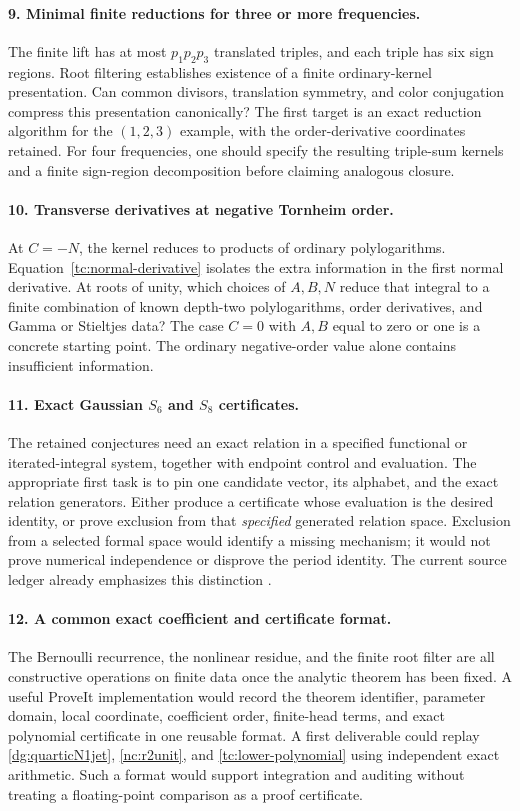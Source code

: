 \documentclass[11pt,a4paper]{article}
\numberwithin{equation}{section}
\theoremstyle{definition}
\theoremstyle{remark}
\begin{document}
\paragraph{9. Minimal finite reductions for three or more frequencies.}
The finite lift has at most $p_1p_2p_3$ translated triples, and each
triple has six sign regions. Root filtering establishes existence
of a finite ordinary-kernel presentation. Can common divisors,
translation symmetry, and color conjugation compress this
presentation canonically? The first target is an exact reduction
algorithm for the $(1,2,3)$ example, with the order-derivative
coordinates retained. For four frequencies, one should specify
the resulting triple-sum kernels and a finite sign-region
decomposition before claiming analogous closure.

\paragraph{10. Transverse derivatives at negative Tornheim order.}
At $C=-N$, the kernel reduces to products of ordinary
polylogarithms. Equation~\eqref{tc:normal-derivative} isolates the
extra information in the first normal derivative. At roots of
unity, which choices of $A,B,N$ reduce that integral to a finite
combination of known depth-two polylogarithms, order derivatives,
and Gamma or Stieltjes data? The case $C=0$ with $A,B$ equal to
zero or one is a concrete starting point. The ordinary
negative-order value alone contains insufficient information.

\paragraph{11. Exact Gaussian $S_6$ and $S_8$ certificates.}
The retained conjectures need an exact relation in a specified
functional or iterated-integral system, together with endpoint
control and evaluation. The appropriate first task is to pin one
candidate vector, its alphabet, and the exact relation generators.
Either produce a certificate whose evaluation is the desired
identity, or prove exclusion from that \emph{specified} generated
relation space. Exclusion from a selected formal space would
identify a missing mechanism; it would not prove numerical
independence or disprove the period identity. The current source
ledger already emphasizes this distinction \cite{repo}.

\paragraph{12. A common exact coefficient and certificate format.}
The Bernoulli recurrence, the nonlinear residue, and the finite root
filter are all constructive operations on finite data once the
analytic theorem has been fixed. A useful ProveIt implementation
would record the theorem identifier, parameter domain, local
coordinate, coefficient order, finite-head terms, and exact
polynomial certificate in one reusable format. A first deliverable
could replay \eqref{dg:quarticN1jet},
\eqref{nc:r2unit}, and \eqref{tc:lower-polynomial} using
independent exact arithmetic. Such a format would support
integration and auditing without treating a floating-point
comparison as a proof certificate.
\end{document}
